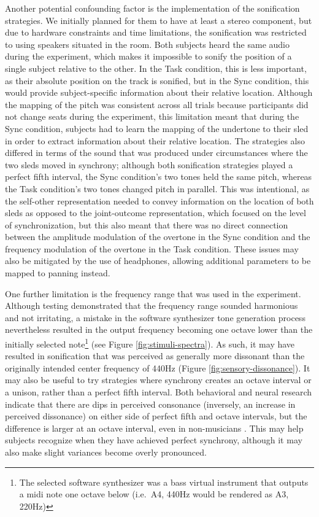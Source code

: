 \documentclass[10pt,a4paper,onecolumn]{article}
\begin{document}
Another potential confounding factor is the implementation of the sonification strategies. We initially planned for them to have at least a stereo component, but due to hardware constraints and time limitations, the sonification was restricted to using speakers situated in the room. Both subjects heard the same audio during the experiment, which makes it impossible to sonify the position of a single subject relative to the other. In the Task condition, this is less important, as their absolute position on the track is sonified, but in the Sync condition, this would provide subject-specific information about their relative location. Although the mapping of the pitch was consistent across all trials because participants did not change seats during the experiment, this limitation meant that during the Sync condition, subjects had to learn the mapping of the undertone to their sled in order to extract information about their relative location. The strategies also differed in terms of the sound that was produced under circumstances where the two sleds moved in synchrony; although both sonification strategies played a perfect fifth interval, the Sync condition's two tones held the same pitch, whereas the Task condition's two tones changed pitch in parallel. This was intentional, as the self-other representation needed to convey information on the location of both sleds as opposed to the joint-outcome representation, which focused on the level of synchronization, but this also meant that there was no direct connection between the amplitude modulation of the overtone in the Sync condition and the frequency modulation of the overtone in the Task condition. These issues may also be mitigated by the use of headphones, allowing additional parameters to be mapped to panning instead.

One further limitation is the frequency range that was used in the experiment. Although testing demonstrated that the frequency range sounded harmonious and not irritating, a mistake in the software synthesizer tone generation process nevertheless resulted in the output frequency becoming one octave lower than the initially selected note\footnote{The selected software synthesizer was a bass virtual instrument that outputs a midi note one octave below (i.e.~A4, 440Hz would be rendered as A3, 220Hz)} (see Figure \ref{fig:stimuli-spectra}). As such, it may have resulted in sonification that was perceived as generally more dissonant than the originally intended center frequency of 440Hz (Figure \ref{fig:sensory-dissonance}). It may also be useful to try strategies where synchrony creates an octave interval or a unison, rather than a perfect fifth interval. Both behavioral and neural research indicate that there are dips in perceived consonance (inversely, an increase in perceived dissonance) on either side of perfect fifth and octave intervals, but the difference is larger at an octave interval, even in non-musicians \autocite{setharesLocalConsonanceRelationship1993,bidelmanNeuralCorrelatesConsonance2009}. This may help subjects recognize when they have achieved perfect synchrony, although it may also make slight variances become overly pronounced.
\end{document}
